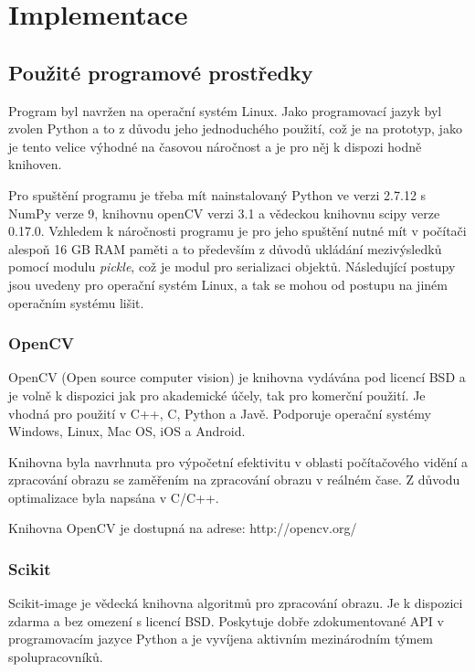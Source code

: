 \documentclass[czech,BP]{thesiskiv}
\begin{document}
\chapter{Implementace}
\section{Použité programové prostředky}
\par Program byl navržen na operační systém Linux. Jako programovací jazyk byl zvolen Python a to z důvodu jeho jednoduchého použití, což je na prototyp, jako je tento velice výhodné na časovou náročnost a je pro něj k dispozi hodně knihoven. 

\par Pro spuštění programu je třeba mít nainstalovaný Python ve verzi 2.7.12 s NumPy verze 9, knihovnu openCV verzi 3.1 a vědeckou knihovnu scipy verze 0.17.0. Vzhledem k náročnosti programu je pro jeho spuštění nutné mít v počítači alespoň 16 GB RAM paměti a to především z důvodů ukládání mezivýsledků pomocí modulu \textit{pickle}, což je modul pro serializaci objektů. Následující postupy jsou uvedeny pro operační systém Linux, a tak se mohou od postupu na jiném operačním systému lišit.   
  
  
\subsection{OpenCV}
\par OpenCV (Open source computer vision) je knihovna vydávána pod licencí BSD a je volně k dispozici jak pro akademické účely, tak pro komerční použití. Je vhodná pro použití v C++, C, Python a Javě. Podporuje operační systémy Windows, Linux, Mac OS, iOS a Android.

\par Knihovna byla navrhnuta pro výpočetní efektivitu v oblasti počítačového vidění a zpracování obrazu se zaměřením na zpracování obrazu v reálném čase. Z důvodu optimalizace byla napsána v C/C++. 

\par Knihovna OpenCV je dostupná na adrese: http://opencv.org/

\subsection{Scikit}
\par Scikit-image je vědecká knihovna algoritmů pro zpracování obrazu. Je k dispozici zdarma a bez omezení s licencí BSD. Poskytuje dobře zdokumentované API v programovacím jazyce Python a je vyvíjena aktivním mezinárodním týmem spolupracovníků.
\cite{Scikit}
\end{document}
